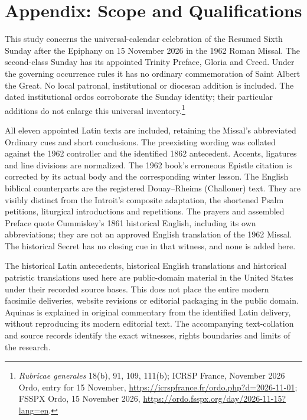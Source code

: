 \section{Appendix: Scope and Qualifications}

This study concerns the universal-calendar celebration of the Resumed Sixth Sunday after the Epiphany on 15 November 2026 in the 1962 Roman Missal. The second-class Sunday has its appointed Trinity Preface, Gloria and Creed. Under the governing occurrence rules it has no ordinary commemoration of Saint Albert the Great. No local patronal, institutional or diocesan addition is included. The dated institutional ordos corroborate the Sunday identity; their particular additions do not enlarge this universal inventory.\footnote{\textit{Rubricae generales} 18(b), 91, 109, 111(b); ICRSP France, November 2026 Ordo, entry for 15 November, \url{https://icrspfrance.fr/ordo.php?d=2026-11-01}; FSSPX Ordo, 15 November 2026, \url{https://ordo.fsspx.org/day/2026-11-15?lang=en}.}

All eleven appointed Latin texts are included, retaining the Missal's abbreviated Ordinary cues and short conclusions. The preexisting wording was collated against the 1962 controller and the identified 1862 antecedent. Accents, ligatures and line divisions are normalized. The 1962 book's erroneous Epistle citation is corrected by its actual body and the corresponding winter lesson. The English biblical counterparts are the registered Douay--Rheims (Challoner) text. They are visibly distinct from the Introit's composite adaptation, the shortened Psalm petitions, liturgical introductions and repetitions. The prayers and assembled Preface quote Cummiskey's 1861 historical English, including its own abbreviations; they are not an approved English translation of the 1962 Missal. The historical Secret has no closing cue in that witness, and none is added here.

The historical Latin antecedents, historical English translations and historical patristic translations used here are public-domain material in the United States under their recorded source bases. This does not place the entire modern facsimile deliveries, website revisions or editorial packaging in the public domain. Aquinas is explained in original commentary from the identified Latin delivery, without reproducing its modern editorial text. The accompanying text-collation and source records identify the exact witnesses, rights boundaries and limits of the research.

